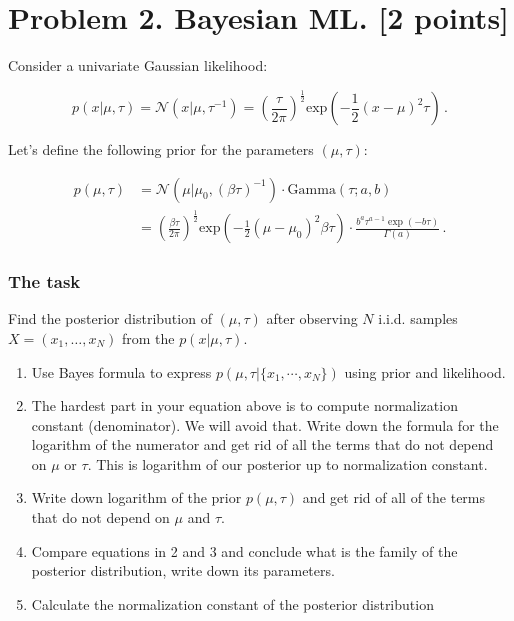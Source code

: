 \documentclass{article}
\begin{document}
\section*{Problem 2. Bayesian ML. [2 points]}

Consider a univariate Gaussian likelihood:

\begin{equation}
    p(x | \mu, \tau)
        = \mathcal{N}(x| \mu, \tau^{-1})
        = \left(\frac{\tau}{2\pi}\right)^{\frac12} \text{exp}\left(-\frac12 (x - \mu)^2\tau \right)
        \,.
\end{equation}

Let's define the following prior for the parameters $(\mu, \tau)$:

\begin{align}
    p(\mu, \tau)
        &= \mathcal{N}(\mu | \mu_0, (\beta \tau)^{-1})\cdot \text{Gamma}(\tau; a, b) \\
        &=  \left(\frac{\beta \tau}{2\pi}\right)^{\frac{1}{2}} \text{exp}\left(-\frac12 (\mu - \mu_0)^2\beta\tau \right) \cdot \frac{b^a \tau^{a-1}\exp(-b\tau)}{\Gamma(a)}
        \,.
\end{align}

\subsubsection*{The task}
Find the posterior distribution of $(\mu, \tau)$ after observing $N$ i.i.d. samples $X = (x_1, \dots, x_N)$ from the $p(x|\mu, \tau)$.
\begin{enumerate}
    \item Use Bayes formula to express $p(\mu, \tau|\{x_1, \cdots, x_N\})$ using prior and likelihood.
    \item The hardest part in your equation above is to compute normalization constant (denominator). We will avoid that. Write down the formula for the logarithm of the numerator and get rid of all the terms that do not depend on $\mu$ or $\tau$. This is logarithm of our posterior up to normalization constant.
    \item Write down logarithm of the prior $p(\mu, \tau)$ and get rid of all of the terms that do not depend on $\mu$ and $\tau$.
    \item Compare equations in 2 and 3 and conclude what is the family of the posterior distribution, write down its parameters.
    \item Calculate the normalization constant of the posterior distribution
\end{enumerate}
\end{document}
